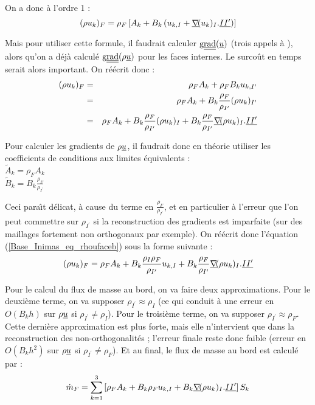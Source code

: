 On a donc \`a l'ordre 1 :
\begin{equation}
(\rho u_k)_F = \rho_F\left[A_k + B_k\left(u_{k,I} +
\underline{\nabla}\!(u_k)_I.\underline{II^\prime}\right)\right]
\end{equation}

Mais pour utiliser cette formule, il faudrait calculer $\text{g}\underline{\underline{{\text{rad}}}}\,\!(\underline{u})$ (trois
appels \`a ), alors qu'on a d\'ej\`a calcul\'e
$\text{g}\underline{\underline{{\text{rad}}}}\,\!(\rho\underline{u})$ pour les faces internes. Le surco\^ut en temps serait alors
important. On r\'e\'ecrit donc :
\begin{eqnarray}
(\rho u_k)_F & = & \rho_F A_k + \rho_F B_ku_{k,I^\prime}\\
& = & \rho_F A_k + B_k\frac{\rho_F}{\rho_{I^\prime}}(\rho u_k)_{I^\prime}
\label{Base_Inimas_eq_rhoufacea}\\
& = & \rho_F A_k + B_k\frac{\rho_F}{\rho_{I^\prime}}(\rho u_k)_I
+B_k\frac{\rho_F}{\rho_{I^\prime}}\underline{\nabla}\!(\rho u_k)_I.\underline{II^\prime}
\label{Base_Inimas_eq_rhoufaceb}
\end{eqnarray}

Pour calculer les gradients de $\rho\underline{u}$, il faudrait donc en th\'eorie
utiliser les coefficients de conditions aux limites \'equivalents :\\
$\tilde{A}_k = \rho_F A_k$\\
$\displaystyle \tilde{B}_k = B_k\frac{\rho_F}{\rho_{I^\prime}}$

Ceci para\^\i t d\'elicat, \`a cause du terme en
$\displaystyle \frac{\rho_F}{\rho_{I^\prime}}$, et en particulier \`a l'erreur
que l'on peut commettre sur $\rho_{I^\prime}$ si la reconstruction des gradients
est imparfaite (sur des maillages fortement non orthogonaux par exemple).
On r\'e\'ecrit donc l'\'equation
(\ref{Base_Inimas_eq_rhoufaceb}) sous la forme suivante :
\begin{equation}
(\rho u_k)_F=\rho_F A_k + B_k\frac{\rho_I\rho_F}{\rho_{I^\prime}}u_{k,I}
+B_k\frac{\rho_F}{\rho_{I^\prime}}\underline{\nabla}\!(\rho u_k)_I.\underline{II^\prime}
\end{equation}


Pour le calcul du flux de masse au bord, on va faire deux approximations. Pour
le deuxi\`eme terme, on va supposer $\rho_{I^\prime}\approx\rho_I$ (ce qui
conduit \`a une erreur en $O(B_kh)$ sur $\rho\underline{u}$ si
$\rho_{I^\prime}\ne \rho_I$). Pour le
troisi\`eme terme, on va supposer $\rho_{I^\prime}\approx\rho_F$. Cette
derni\`ere approximation est plus forte, mais elle n'intervient que dans la
reconstruction des non-orthogonalit\'es ; l'erreur finale reste donc faible
(erreur en $O(B_kh^2)$ sur $\rho\underline{u}$ si
$\rho_{I^\prime}\ne \rho_F$).
Et au final, le flux de masse au bord est calcul\'e par :
\begin{equation}
\dot{m}_F = \sum\limits_{k=1}^{3}\left[\rho_F A_k + B_k\rho_Fu_{k,I}
+B_k\underline{\nabla}\!(\rho u_k)_I.\underline{II^\prime}\right]S_k
\end{equation}

